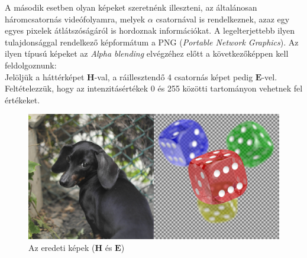 A második esetben olyan képeket szeretnénk illeszteni, az általánosan háromcsatornás videófolyamra, melyek $\alpha$ csatornával is rendelkeznek, azaz egy egyes pixelek átlátszóságáról is hordoznak információkat. A legelterjettebb ilyen tulajdonsággal rendelkező képformátum a PNG (\textit{Portable Network Graphics}). Az ilyen típusú képeket az \textit{Alpha blending} elvégzéhez előtt a következőképpen kell feldolgoznunk:\\
Jelöljük a háttérképet $\boldsymbol H$-val, a ráillesztendő 4 csatornás képet pedig $\boldsymbol E$-vel. Feltételezzük, hogy az intenzitásértékek 0 és 255 közötti tartományon vehetnek fel értékeket.
\begin{figure}[h]
	\centering
	\includegraphics[width=6.82truecm, height=3.41truecm]{images/blending_01.png}
	\caption{Az eredeti képek ($\boldsymbol H$ és  $\boldsymbol E$)}
	\label{fig:blend01}
\end{figure}	
